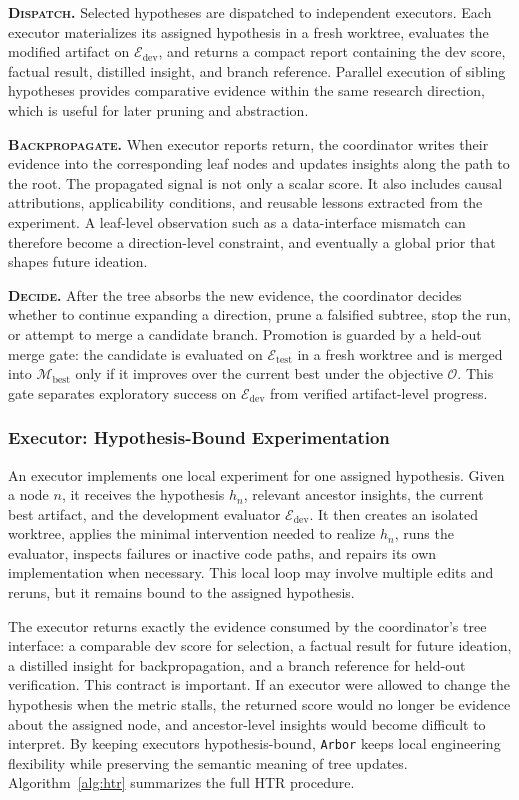 \documentclass{llmxive}
\providecommand{\arbor}{\texttt{Arbor}}
\providecommand{\Mat}{\mathcal{M}}
\providecommand{\Obj}{\mathcal{O}}
\providecommand{\Eval}{\mathcal{E}}
\providecommand{\dev}{\mathrm{dev}}
\providecommand{\test}{\mathrm{test}}
\begin{document}
\textbf{\textsc{Dispatch}.}
Selected hypotheses are dispatched to independent executors. Each executor
materializes its assigned hypothesis in a fresh worktree, evaluates the modified
artifact on $\Eval_{\dev}$, and returns a compact report containing the dev
score, factual result, distilled insight, and branch reference. Parallel
execution of sibling hypotheses provides comparative evidence within the same
research direction, which is useful for later pruning and abstraction.

\textbf{\textsc{Backpropagate}.}
When executor reports return, the coordinator writes their evidence into the
corresponding leaf nodes and updates insights along the path to the root. The
propagated signal is not only a scalar score. It also includes causal
attributions, applicability conditions, and reusable lessons extracted from the
experiment. A leaf-level observation such as a data-interface mismatch can
therefore become a direction-level constraint, and eventually a global prior
that shapes future ideation.

\textbf{\textsc{Decide}.}
After the tree absorbs the new evidence, the coordinator decides whether to
continue expanding a direction, prune a falsified subtree, stop the run, or
attempt to merge a candidate branch. Promotion is guarded by a held-out merge
gate: the candidate is evaluated on $\Eval_{\test}$ in a fresh worktree and is
merged into $\Mat_{\mathrm{best}}$ only if it improves over the current best
under the objective $\Obj$. This gate separates exploratory success on
$\Eval_{\dev}$ from verified artifact-level progress.

\subsubsection{Executor: Hypothesis-Bound Experimentation}
\label{sec:framework-executor}
An executor implements one local experiment for one assigned hypothesis. Given a node $n$, it receives the hypothesis $h_n$, relevant ancestor insights, the
current best artifact, and the development evaluator $\Eval_{\dev}$. It then
creates an isolated worktree, applies the minimal intervention needed to realize
$h_n$, runs the evaluator, inspects failures or inactive code paths, and repairs
its own implementation when necessary. This local loop may involve multiple
edits and reruns, but it remains bound to the assigned hypothesis.

The executor returns exactly the evidence consumed by the coordinator's tree
interface: a comparable dev score for selection, a factual result for future
ideation, a distilled insight for backpropagation, and a branch reference for
held-out verification. This contract is important. If an executor were allowed
to change the hypothesis when the metric stalls, the returned score would no
longer be evidence about the assigned node, and ancestor-level insights would
become difficult to interpret. By keeping executors hypothesis-bound, \arbor{}
keeps local engineering flexibility while preserving the semantic meaning of
tree updates. Algorithm~\ref{alg:htr} summarizes the full HTR procedure.
\end{document}
